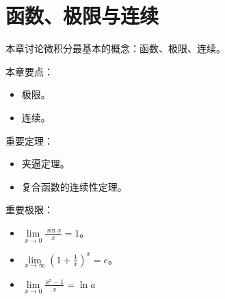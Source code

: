 \chapter{函数、极限与连续}

本章讨论微积分最基本的概念：函数、极限、连续。

本章要点：
\begin{itemize}
    \item 极限。
    \item 连续。
\end{itemize}

重要定理：
\begin{itemize}
    \item 夹逼定理。
    \item 复合函数的连续性定理。
\end{itemize}

重要极限：
\begin{itemize}
    \item $\underset{x\rightarrow 0}{\lim}\frac{\sin x}{x}=1$。
    \item $\underset{x\rightarrow \infty}{\lim}\left( 1+\frac{1}{x} \right) ^x=e$。
    \item $\underset{x\rightarrow 0}{\lim}\frac{a^x-1}{x}=\ln a$
\end{itemize}

\newpage


\newpage


\newpage


\newpage


\newpage


\newpage


\newpage





